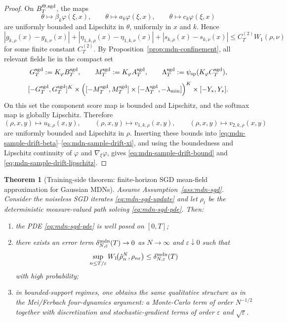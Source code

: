\documentclass[11pt]{article}
\newtheorem{theorem}{Theorem}
\theoremstyle{definition}
\begin{document}
\begin{proof}
On $B_T^{\Theta,\rm sgd}$, the maps
\[
  \theta\mapsto \beta_k\varphi(\xi,x),
  \qquad
  \theta\mapsto a_k\varphi(\xi,x),
  \qquad
  \theta\mapsto c_k\varphi(\xi,x)
\]
are uniformly bounded and Lipschitz in $\theta$, uniformly in $x$ and $k$.
Hence
\[
  |g_{k,\rho}(x)-g_{k,\nu}(x)|
  +
  |\eta_{1,k,\rho}(x)-\eta_{1,k,\nu}(x)|
  +
  |s_{k,\rho}(x)-s_{k,\nu}(x)|
  \le
  C_T^{(2)}W_1(\rho,\nu)
\]
for some finite constant $C_T^{(2)}$. By Proposition~\ref{prop:mdn-confinement},
all relevant fields lie in the compact set
\[
  G_T^{\rm sgd}:=K_\varphi B_T^{\rm sgd},
  \qquad
  M_T^{\rm sgd}:=K_\varphi A_T^{\rm sgd},
  \qquad
  \Lambda_T^{\rm sgd}:=\psi_{\rm sp}(K_\varphi C_T^{\rm sgd}),
\]
\[
  [-G_T^{\rm sgd},G_T^{\rm sgd}]^K
  \times
  \Big(
    [-M_T^{\rm sgd},M_T^{\rm sgd}]
    \times
    [-\Lambda_T^{\rm sgd},-\lambda_{\min}]
  \Big)^K
  \times
  [-Y_\ast,Y_\ast].
\]
On this set the component score map is bounded and Lipschitz, and the softmax
map is globally Lipschitz. Therefore
\[
  (\rho,x,y)\mapsto u_{k,\rho}(x,y),
  \qquad
  (\rho,x,y)\mapsto v_{1,k,\rho}(x,y),
  \qquad
  (\rho,x,y)\mapsto v_{2,k,\rho}(x,y)
\]
are uniformly bounded and Lipschitz in $\rho$. Inserting these bounds into
\eqref{eq:mdn-sample-drift-beta}--\eqref{eq:mdn-sample-drift-xi}, and using the
boundedness and Lipschitz continuity of $\varphi$ and $\nabla_\xi\varphi$,
gives \eqref{eq:mdn-sample-drift-bound} and
\eqref{eq:mdn-sample-drift-lipschitz}.
\end{proof}

\begin{theorem}[Training-side theorem: finite-horizon SGD mean-field approximation for Gaussian MDNs]
\label{thm:mdn-sgd-mean-field}
Assume Assumption~\ref{ass:mdn-sgd}. Consider the noiseless SGD iterates
\eqref{eq:mdn-sgd-update} and let $\rho_t$ be the deterministic measure-valued
path solving \eqref{eq:mdn-sgd-pde}. Then:
\begin{enumerate}[label=(\roman*)]
  \item the PDE \eqref{eq:mdn-sgd-pde} is well posed on $[0,T]$;
  \item there exists an error term
  $\delta_{N,\varepsilon}^{\rm mdn}(T)\to 0$ as $N\to\infty$ and
  $\varepsilon\downarrow 0$ such that
  \[
    \sup_{n\le T/\varepsilon}
    W_1\!\bigl(\hat\rho_n^N,\rho_{n\varepsilon}\bigr)
    \le
    \delta_{N,\varepsilon}^{\rm mdn}(T)
  \]
  with high probability;
  \item in bounded-support regimes, one obtains the same qualitative structure
  as in the Mei/Ferbach four-dynamics argument: a Monte-Carlo term of order
  $N^{-1/2}$ together with discretization and stochastic-gradient terms of
  order $\varepsilon$ and $\sqrt{\varepsilon}$.
\end{enumerate}
\end{theorem}
\end{document}
